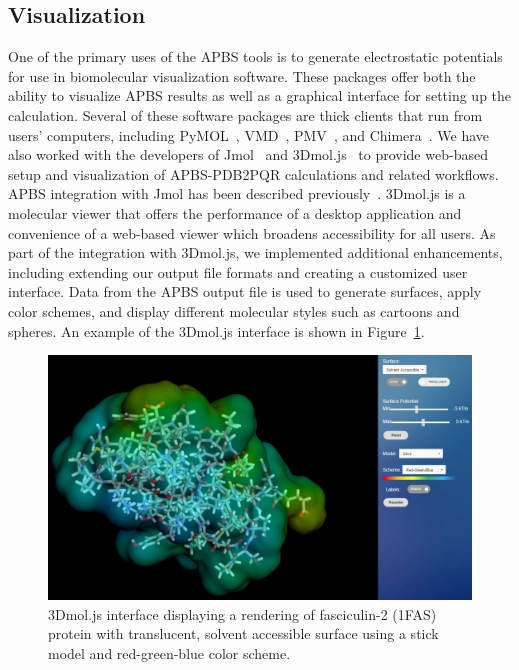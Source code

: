 \documentclass[12pt,titlepage]{article}
\begin{document}
\subsection{Visualization}
One of the primary uses of the APBS tools is to generate electrostatic potentials for use in biomolecular visualization software.
These packages offer both the ability to visualize APBS results as well as a graphical interface for setting up the calculation.
Several of these software packages are thick clients that run from users' computers, including PyMOL~\cite{PyMOL, PyMOLweb}, VMD~\cite{VMDweb, Humphrey1996}, PMV~\cite{PMV, MGLToolsweb}, and Chimera~\cite{Chimeraweb, Pettersen2004}.
We have also worked with the developers of Jmol~\cite{Jmolweb, Herraez2006} and 3Dmol.js~\cite{3Dmolweb, Rego2015} to provide web-based setup and visualization of APBS-PDB2PQR calculations and related workflows.
APBS integration with Jmol has been described previously~\cite{Unni2011}.
3Dmol.js is a molecular viewer that offers the performance of a desktop application and convenience of a web-based viewer which broadens accessibility for all users.
As part of the integration with 3Dmol.js, we implemented additional enhancements, including extending our output file formats and creating a customized user interface.
Data from the APBS output file is used to generate surfaces, apply color schemes, and display different molecular styles such as cartoons and spheres.
An example of the 3Dmol.js interface is shown in Figure~\ref{fig:3dmol_interface}.
\begin{figure} 
	\begin{center}
		\includegraphics[width=.80\textwidth]{3dmol_interface}
		\caption{3Dmol.js interface displaying a rendering of fasciculin-2 (1FAS) protein with translucent, solvent accessible surface using a stick model and red-green-blue color scheme. \label{fig:3dmol_interface}}  
	\end{center}  
\end{figure}
\end{document}
